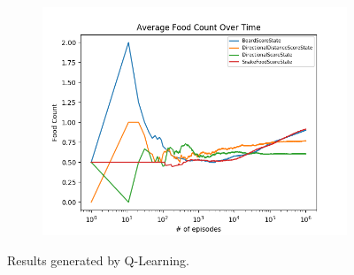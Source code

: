 \documentclass[result.tex]{subfiles}
\begin{document}
\begin{figure}[ht]
        \begin{subfigure}[b]{.35\linewidth}
            \includegraphics[width=\linewidth]{../images/qlearning/state/234/score_average_food_count_over_time.png}
        \end{subfigure}
        \caption{Results generated by Q-Learning.}
        \label{fig:state_result_qlearning}
    \end{figure}
\end{document}

